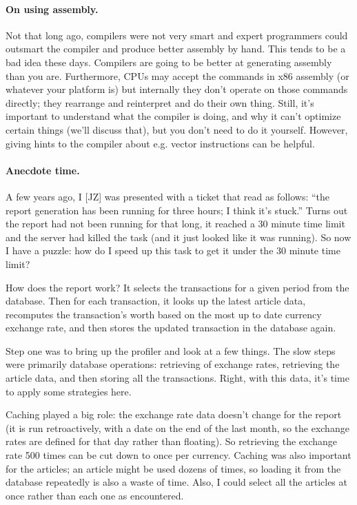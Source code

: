 \paragraph{On using assembly.} Not that long ago, compilers were not very smart and expert programmers could outsmart the compiler and produce better assembly by hand. This tends to be a bad idea these days. Compilers are going to be better at generating assembly than you are. Furthermore, CPUs may accept the commands in x86 assembly (or whatever your platform is) but internally they don't operate on those commands directly; they rearrange and reinterpret and do their own thing. Still, it's important to understand what the compiler is doing, and why it can't optimize certain things (we'll discuss that), but you don't need to do it yourself. However, giving hints to the compiler about e.g. vector instructions can be helpful.

\paragraph{Anecdote time.} A few years ago, I [JZ] was presented with a ticket that read as follows: ``the report generation has been running for three hours; I think it's stuck.'' Turns out the report had not been running for that long, it reached a 30 minute time limit and the server had killed the task (and it just looked like it was running). So now I have a puzzle: how do I speed up this task to get it under the 30 minute time limit?

How does the report work? It selects the transactions for a given period from the database. Then for each transaction, it looks up the latest article data, recomputes the transaction's worth based on the most up to date currency exchange rate, and then stores the updated transaction in the database again.

Step one was to bring up the profiler and look at a few things. The slow steps were primarily database operations: retrieving of exchange rates, retrieving the article data, and then storing all the transactions. Right, with this data, it's time to apply some strategies here.

Caching played a big role: the exchange rate data doesn't change for the report (it is run retroactively, with a date on the end of the last month, so the exchange rates are defined for that day rather than floating). So retrieving the exchange rate 500 times can be cut down to once per currency. Caching was also important for the articles; an article might be used dozens of times, so loading it from the database repeatedly is also a waste of time. Also, I could select all the articles at once rather than each one as encountered.

